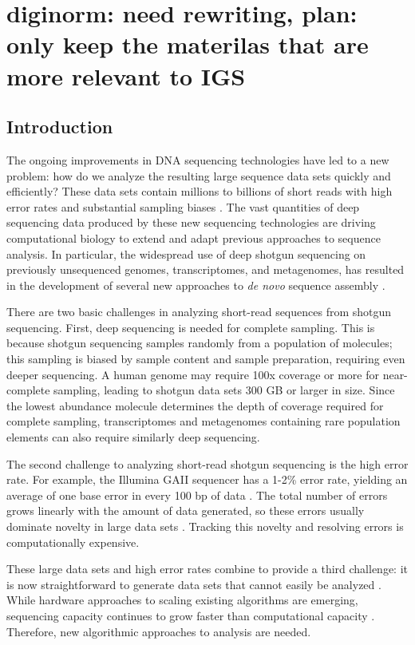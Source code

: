 \chapter{diginorm: need rewriting, plan: only keep the materilas that are more relevant to IGS }

\section{Introduction}

The ongoing improvements in DNA sequencing technologies have led to a
new problem: how do we analyze the resulting large sequence data sets
quickly and efficiently? These data sets contain millions to billions
of short reads with high error rates and substantial sampling
biases \cite{pubmed19997069}.  The vast quantities of deep sequencing
data produced by these new sequencing technologies are driving
computational biology to extend and adapt previous approaches to
sequence analysis.  In particular, the widespread use of deep shotgun
sequencing on previously unsequenced genomes, transcriptomes, and
metagenomes, has resulted in the development of several new approaches
to {\em de novo} sequence assembly \cite{pubmed20211242}.

There are two basic challenges in analyzing short-read sequences from
shotgun sequencing. First, deep sequencing is needed for complete
sampling. This is because shotgun sequencing samples randomly from a
population of molecules; this sampling is biased by sample content and
sample preparation, requiring even deeper sequencing. A human genome
may require 100x coverage or more for near-complete sampling, leading
to shotgun data sets 300 GB or larger in size\cite{pubmed21187386}.
Since the lowest abundance molecule determines the depth of coverage
required for complete sampling, transcriptomes and metagenomes
containing rare population elements can also require similarly
deep sequencing.

The second challenge to analyzing short-read shotgun sequencing is the
high error rate.  For example, the Illumina GAII sequencer has a 1-2\% error
rate, yielding an average of one base error in every 100 bp of data
\cite{pubmed19997069}.  The total number of errors grows linearly with
the amount of data generated, so these errors usually dominate
novelty in large data sets \cite{pubmed21245053}.  Tracking this
novelty and resolving errors is computationally expensive.

These large data sets and high error rates combine to provide a third
challenge: it is now straightforward to generate data sets that cannot
easily be analyzed \cite{pubmed21867570}.  While hardware approaches
to scaling existing algorithms are emerging, sequencing capacity
continues to grow faster than computational capacity
\cite{pubmed20441614}.  Therefore, new algorithmic approaches to
analysis are needed.

